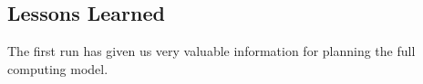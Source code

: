 \subsection{Lessons Learned}
The first  run has given us very valuable information for planning the full  computing model. 

